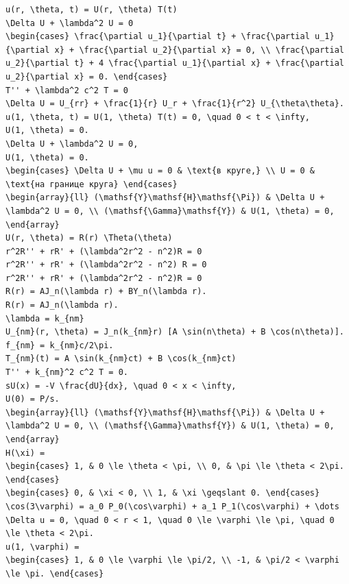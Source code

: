 \documentclass[
  ukrainian,
]{article}
\begin{document}
\begin{verbatim}
u(r, \theta, t) = U(r, \theta) T(t)
\Delta U + \lambda^2 U = 0
\begin{cases} \frac{\partial u_1}{\partial t} + \frac{\partial u_1}{\partial x} + \frac{\partial u_2}{\partial x} = 0, \\ \frac{\partial u_2}{\partial t} + 4 \frac{\partial u_1}{\partial x} + \frac{\partial u_2}{\partial x} = 0. \end{cases}
T'' + \lambda^2 c^2 T = 0
\Delta U = U_{rr} + \frac{1}{r} U_r + \frac{1}{r^2} U_{\theta\theta}.
u(1, \theta, t) = U(1, \theta) T(t) = 0, \quad 0 < t < \infty,
U(1, \theta) = 0.
\Delta U + \lambda^2 U = 0,
U(1, \theta) = 0.
\begin{cases} \Delta U + \mu u = 0 & \text{в круге,} \\ U = 0 & \text{на границе круга} \end{cases}
\begin{array}{ll} (\mathsf{Y}\mathsf{H}\mathsf{\Pi}) & \Delta U + \lambda^2 U = 0, \\ (\mathsf{\Gamma}\mathsf{Y}) & U(1, \theta) = 0, \end{array}
U(r, \theta) = R(r) \Theta(\theta)
r^2R'' + rR' + (\lambda^2r^2 - n^2)R = 0
r^2R'' + rR' + (\lambda^2r^2 - n^2) R = 0
r^2R'' + rR' + (\lambda^2r^2 - n^2)R = 0
R(r) = AJ_n(\lambda r) + BY_n(\lambda r).
R(r) = AJ_n(\lambda r).
\lambda = k_{nm}
U_{nm}(r, \theta) = J_n(k_{nm}r) [A \sin(n\theta) + B \cos(n\theta)].
f_{nm} = k_{nm}c/2\pi.
T_{nm}(t) = A \sin(k_{nm}ct) + B \cos(k_{nm}ct)
T'' + k_{nm}^2 c^2 T = 0.
sU(x) = -V \frac{dU}{dx}, \quad 0 < x < \infty,
U(0) = P/s.
\begin{array}{ll} (\mathsf{Y}\mathsf{H}\mathsf{\Pi}) & \Delta U + \lambda^2 U = 0, \\ (\mathsf{\Gamma}\mathsf{Y}) & U(1, \theta) = 0, \end{array}
H(\xi) =
\begin{cases} 1, & 0 \le \theta < \pi, \\ 0, & \pi \le \theta < 2\pi. \end{cases}
\begin{cases} 0, & \xi < 0, \\ 1, & \xi \geqslant 0. \end{cases}
\cos(3\varphi) = a_0 P_0(\cos\varphi) + a_1 P_1(\cos\varphi) + \dots
\Delta u = 0, \quad 0 < r < 1, \quad 0 \le \varphi \le \pi, \quad 0 \le \theta < 2\pi.
u(1, \varphi) =
\begin{cases} 1, & 0 \le \varphi \le \pi/2, \\ -1, & \pi/2 < \varphi \le \pi. \end{cases}

\end{verbatim}
\end{document}
